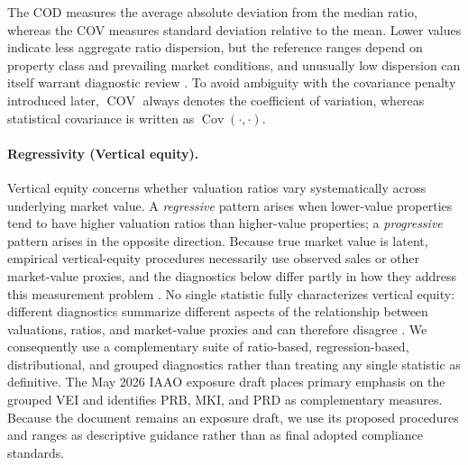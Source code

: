 \documentclass[10pt]{article}
\theoremstyle{definition}
\newcommand{\1}{\mathbf{1}}
\begin{document}
{The COD measures the average absolute deviation from the median ratio, whereas the COV measures standard deviation relative to the mean. Lower values indicate less aggregate ratio dispersion, but the reference ranges depend on property class and prevailing market conditions, and unusually low dispersion can itself warrant diagnostic review \cite{IAAO2013Ratio,IAAO2026ExposureRatio}.}
To avoid ambiguity with the covariance penalty introduced later, $\operatorname{COV}$ always denotes the coefficient of variation, whereas statistical covariance is written as $\operatorname{Cov}(\cdot,\cdot)$.

\paragraph{Regressivity (Vertical equity).}
{Vertical equity concerns whether valuation ratios vary systematically across underlying market value. A \emph{regressive} pattern arises when lower-value properties tend to have higher valuation ratios than higher-value properties; a \emph{progressive} pattern arises in the opposite direction. Because true market value is latent, empirical vertical-equity procedures necessarily use observed sales or other market-value proxies, and the diagnostics below differ partly in how they address this measurement problem \cite{IAAO2026ExposureRatio}. No single statistic fully characterizes vertical equity: different diagnostics summarize different aspects of the relationship between valuations, ratios, and market-value proxies and can therefore disagree \cite{IAAO2023VerticalReview,IAAO2026ExposureRatio}. We consequently use a complementary suite of ratio-based, regression-based, distributional, and grouped diagnostics rather than treating any single statistic as definitive. The May 2026 IAAO exposure draft places primary emphasis on the grouped VEI and identifies PRB, MKI, and PRD as complementary measures. Because the document remains an exposure draft, we use its proposed procedures and ranges as descriptive guidance rather than as final adopted compliance standards.}
\end{document}
